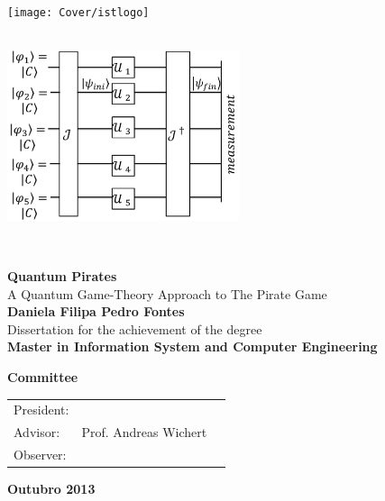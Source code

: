 \setcounter{page}{1} 


\thispagestyle{empty}
\begin{flushleft} ~\\ \vspace{-10mm} \hspace{-9mm}  \texttt{[image: Cover/istlogo]} 
\\ \vspace{5mm}
~\\ \begin{center} \includegraphics[height=50mm]{Figures/Cover/esquema.png}  \end{center} %
~\\ \vspace{5mm}
\begin{centering}
\LARGE \textbf{Quantum Pirates}
\\ \vspace{5mm}
\Large A Quantum Game-Theory Approach to The Pirate Game
\\ \vspace{15mm}
\Large \textbf{Daniela Filipa Pedro Fontes}
\\ \vspace{15mm}
\large Dissertation for the achievement of the degree
\\ \vspace{2mm}
\LARGE \textbf{Master in Information System and Computer Engineering}
\\ \vspace{20mm}

\Large \textbf{Committee}
\\ \vspace{7mm}
\begin{tabular}{lcl}
\large President: 	&   & \large \\ 
\large Advisor:   &Prof. Andreas Wichert& \large \\ 
\large Observer:	 				&   & \large \\
\end{tabular}
 
\vspace{7mm}

\Large \textbf{Outubro 2013} \\
\end{centering}
\let\thepage\relax
\end{flushleft}
\pagebreak


